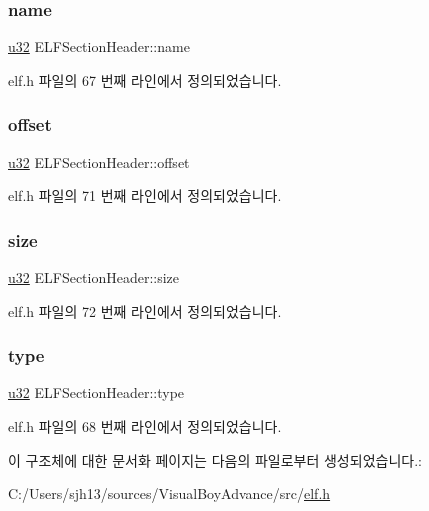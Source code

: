 \subsubsection{\texorpdfstring{name}{name}}
{\footnotesize\ttfamily \mbox{\hyperlink{_system_8h_a10e94b422ef0c20dcdec20d31a1f5049}{u32}} E\+L\+F\+Section\+Header\+::name}



elf.\+h 파일의 67 번째 라인에서 정의되었습니다.

\mbox{\label{struct_e_l_f_section_header_af1fc22111db70b6b813f0da79e9cca04}} 
\subsubsection{\texorpdfstring{offset}{offset}}
{\footnotesize\ttfamily \mbox{\hyperlink{_system_8h_a10e94b422ef0c20dcdec20d31a1f5049}{u32}} E\+L\+F\+Section\+Header\+::offset}



elf.\+h 파일의 71 번째 라인에서 정의되었습니다.

\mbox{\label{struct_e_l_f_section_header_a4c1eb98142e250c761f54d89388e86ab}} 
\subsubsection{\texorpdfstring{size}{size}}
{\footnotesize\ttfamily \mbox{\hyperlink{_system_8h_a10e94b422ef0c20dcdec20d31a1f5049}{u32}} E\+L\+F\+Section\+Header\+::size}



elf.\+h 파일의 72 번째 라인에서 정의되었습니다.

\mbox{\label{struct_e_l_f_section_header_a0e73af321f9f8f29d7696211bdfbe98e}} 
\subsubsection{\texorpdfstring{type}{type}}
{\footnotesize\ttfamily \mbox{\hyperlink{_system_8h_a10e94b422ef0c20dcdec20d31a1f5049}{u32}} E\+L\+F\+Section\+Header\+::type}



elf.\+h 파일의 68 번째 라인에서 정의되었습니다.



이 구조체에 대한 문서화 페이지는 다음의 파일로부터 생성되었습니다.\+:\begin{DoxyCompactItemize}
\item 
C\+:/\+Users/sjh13/sources/\+Visual\+Boy\+Advance/src/\mbox{\hyperlink{elf_8h}{elf.\+h}}\end{DoxyCompactItemize}
